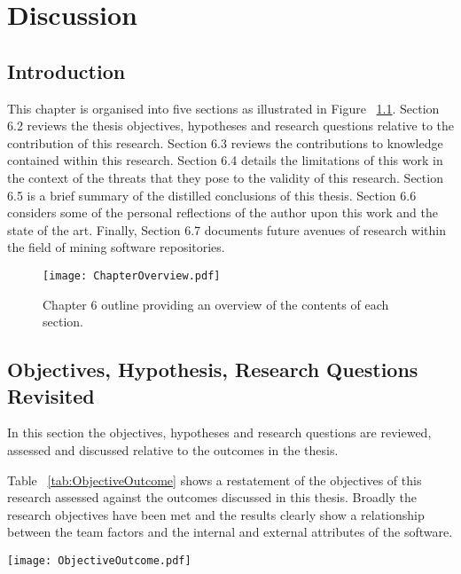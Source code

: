 
\graphicspath{{Chapter6/Figures/}{Chapter6/Tables/}{Chapter6/Charts/}}

\chapter{Discussion}
\section{Introduction} %
This chapter is organised into five sections as illustrated in Figure ~\ref{fig:chapter6overview}. Section 6.2 reviews the thesis objectives, hypotheses and research questions relative to the contribution of this research. Section 6.3 reviews the contributions to knowledge contained within this research. Section 6.4 details the limitations of this work in the context of the threats that they pose to the validity of this research. Section 6.5 is a brief summary of the distilled conclusions of this thesis. Section 6.6 considers some of the personal reflections of the author upon this work and the state of the art. Finally, Section 6.7 documents future avenues of research within the field of mining software repositories.

\begin{landscape}
\begin{figure}[htbp!] 
\centering    
\texttt{[image: ChapterOverview.pdf]}
\caption{Chapter 6 outline providing an overview of the contents of each section.}
\label{fig:chapter6overview}
\end{figure}
\end{landscape}

\section{Objectives, Hypothesis, Research Questions Revisited} %
In this section the objectives, hypotheses and research questions are reviewed, assessed and discussed relative to the outcomes in the thesis.

Table ~\ref{tab:ObjectiveOutcome} shows a restatement of the objectives of this research assessed against the outcomes discussed in this thesis. Broadly the research objectives have been met and the results clearly show a relationship between the team factors and the internal and external attributes of the software. 

\begin{table}
\begin{tabular}
 \centering 
 \texttt{[image: ObjectiveOutcome.pdf]}
 \label{tab:ObjectiveOutcome}
\end{tabular}
\end{table}

